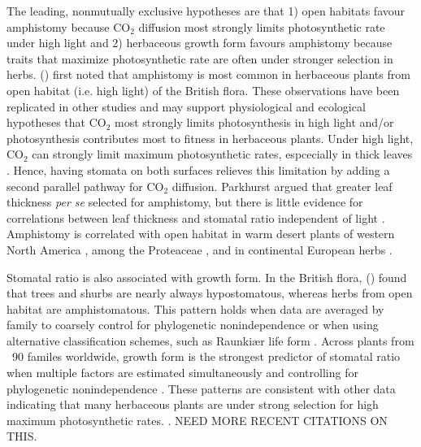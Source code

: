 \documentclass[12pt, oneside]{article}
\begin{document}

The leading, nonmutually exclusive hypotheses are that 1) open habitats favour amphistomy because CO$_2$ diffusion most strongly limits photosynthetic rate under high light and 2) herbaceous growth form favours amphistomy because traits that maximize photosynthetic rate are often under stronger selection in herbs. \citeauthor{Salisbury_1927} (\citeyear{Salisbury_1927}) first noted that amphistomy is most common in herbaceous plants from open habitat (i.e. high light) of the British flora. These observations have been replicated in other studies \citep{Mott_etal_1982, Peat_Fitter_1994b, Jordan_etal_2014, Muir_2015} and may support physiological and ecological hypotheses that CO$_2$ most strongly limits photosynthesis in high light and/or photosynthesis contributes most to fitness in herbaceous plants. Under high light, CO$_2$ can strongly limit maximum photosynthetic rates, espcecially in thick leaves \citep{Jones_1985}. Hence, having stomata on both surfaces relieves this limitation by adding a second parallel pathway for CO$_2$ diffusion. Parkhurst \citeyear{Parkhurst_1978} argued that greater leaf thickness \textit{per se} selected for amphistomy, but there is little evidence for correlations between leaf thickness and stomatal ratio independent of light \citep{Mott_etal_1982, Gibson_1996, Muir_2015}. Amphistomy is correlated with open habitat in warm desert plants of western North America \citep{Mott_etal_1982, Gibson_1996}, among the Proteaceae \citep{Jordan_etal_2014}, and in continental European herbs \citep{Bucher_etal_2017}.

Stomatal ratio is also associated with growth form. In the British flora, \citeauthor{Salisbury_1927} (\citeyear{Salisbury_1927}) found that trees and shurbs are nearly always hypostomatous, whereas herbs from open habitat are amphistomatous. This pattern holds when data are averaged by family to coarsely control for phylogenetic nonindependence \citep{Peat_Fitter_1994b} or when using alternative classification schemes, such as Raunki\ae r life form \citep{Peat_Fitter_1994b}. Across plants from ~90 familes worldwide, growth form is the strongest predictor of stomatal ratio when multiple factors are estimated simultaneously and controlling for phylogenetic nonindependence \citep{Muir_2015}. These patterns are consistent with other data indicating that many herbaceous plants are under strong selection for high maximum photosynthetic rates. \citep{Bazzaz_1979, Korner_etal_1989}. NEED MORE RECENT CITATIONS ON THIS.
\end{document}
